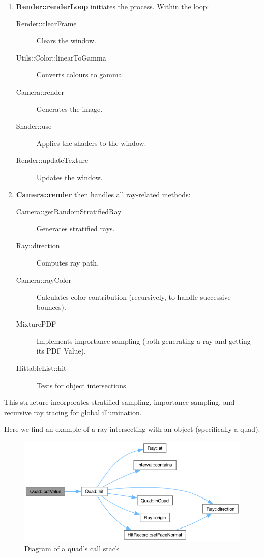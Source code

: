 \documentclass[12pt]{article}
\begin{document}
\begin{enumerate}
    \item \textbf{Render::renderLoop} initiates the process. Within the loop:
          \begin{description}
              \item[Render::clearFrame] Clears the window.
              \item[Utils::Color::linearToGamma] Converts colours to gamma.
              \item[Camera::render] Generates the image.
              \item[Shader::use] Applies the shaders to the window.
              \item[Render::updateTexture] Updates the window.
          \end{description}

    \item \textbf{Camera::render} then handles all ray-related methods:
          \begin{description}
              \item[Camera::getRandomStratifiedRay] Generates stratified rays.
              \item[Ray::direction] Computes ray path.
              \item[Camera::rayColor] Calculates color contribution (recursively, to handle successive bounces).
              \item[MixturePDF] Implements importance sampling (both generating a ray and getting its PDF Value).
              \item[HittableList::hit] Tests for object intersections.
          \end{description}

\end{enumerate}
This structure incorporates stratified sampling, importance sampling, and recursive ray tracing for global illumination.

Here we find an example of a ray intersecting with an object (specifically a quad):

\begin{figure}[H]
    \centering
    \includegraphics[width=\textwidth]{images/software_architecture/quad_loop_call.png}
    \caption{Diagram of a quad's call stack}
    \label{fig:quadcallstack}
\end{figure}
\end{document}
